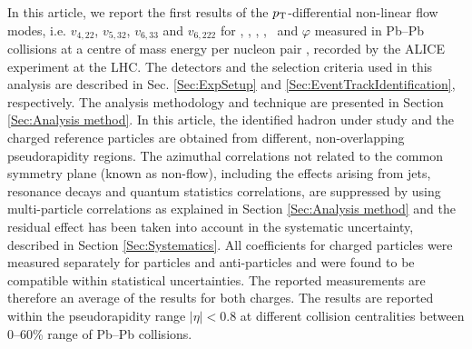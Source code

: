 In this article, we report the first results of the $p_{\rm{T}}$-differential non-linear flow modes, i.e. $v_{4,22}$, $v_{5,32}$, $v_{6,33}$ and $v_{6,222}$ for \pion, \kaon, \Ks, \proton, \lambdas~and $\varphi$ measured in Pb--Pb collisions at a centre of mass energy per nucleon pair \sNN, recorded by the ALICE experiment \cite{Aamodt:2008zz} at the LHC. The detectors and the selection criteria used in  this analysis are described in Sec. \ref{Sec:ExpSetup} and \ref{Sec:EventTrackIdentification}, respectively. %
The analysis methodology and technique are presented in Section \ref{Sec:Analysis method}. In this article, the identified hadron under study and the charged reference particles are obtained from different, non-overlapping pseudorapidity regions. The azimuthal correlations not related to the common symmetry plane (known as non-flow), including the effects arising from jets, resonance decays and quantum statistics correlations, are suppressed by using multi-particle correlations as explained in Section \ref{Sec:Analysis method} and the residual effect has been taken into account in the systematic uncertainty, described in Section \ref{Sec:Systematics}. All coefficients for charged particles were measured separately for particles and anti-particles and were found to be compatible within statistical uncertainties. The reported measurements are therefore an average of the results for both charges. The results are reported within the pseudorapidity range $|\eta|<0.8$ at different collision centralities between 0--60\% range of Pb--Pb collisions. 





